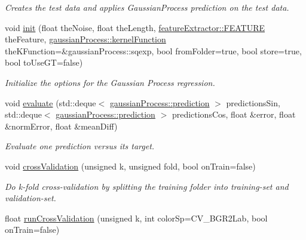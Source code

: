 \begin{DoxyCompactItemize}
\begin{DoxyCompactList}\small\item\em Creates the test data and applies {\ttfamily GaussianProcess} prediction on the test data. \item\end{DoxyCompactList}\item 
\hypertarget{classclassifyImages_a5e6aa99e69271c26a65886f98575a96f}{
void \hyperlink{classclassifyImages_a5e6aa99e69271c26a65886f98575a96f}{init} (float theNoise, float theLength, \hyperlink{classfeatureExtractor_a84a8847c4124b284d1d5ae20bc9be583}{featureExtractor::FEATURE} theFeature, \hyperlink{classgaussianProcess_a9255dbcbf2dc6ef9723b538659acd491}{gaussianProcess::kernelFunction} theKFunction=\&gaussianProcess::sqexp, bool fromFolder=true, bool store=true, bool toUseGT=false)}
\label{classclassifyImages_a5e6aa99e69271c26a65886f98575a96f}

\begin{DoxyCompactList}\small\item\em Initialize the options for the Gaussian Process regression. \item\end{DoxyCompactList}\item 
\hypertarget{classclassifyImages_af9c8000367d65a5b122d28b3a644524d}{
void \hyperlink{classclassifyImages_af9c8000367d65a5b122d28b3a644524d}{evaluate} (std::deque$<$ \hyperlink{structgaussianProcess_1_1prediction}{gaussianProcess::prediction} $>$ predictionsSin, std::deque$<$ \hyperlink{structgaussianProcess_1_1prediction}{gaussianProcess::prediction} $>$ predictionsCos, float \&error, float \&normError, float \&meanDiff)}
\label{classclassifyImages_af9c8000367d65a5b122d28b3a644524d}

\begin{DoxyCompactList}\small\item\em Evaluate one prediction versus its target. \item\end{DoxyCompactList}\item 
\hypertarget{classclassifyImages_a9ce049acd6facc12e25b5a93b594c8be}{
void \hyperlink{classclassifyImages_a9ce049acd6facc12e25b5a93b594c8be}{crossValidation} (unsigned k, unsigned fold, bool onTrain=false)}
\label{classclassifyImages_a9ce049acd6facc12e25b5a93b594c8be}

\begin{DoxyCompactList}\small\item\em Do k-\/fold cross-\/validation by splitting the training folder into training-\/set and validation-\/set. \item\end{DoxyCompactList}\item 
\hypertarget{classclassifyImages_a43f25d339fca753436874bcbbe1fcd9b}{
float \hyperlink{classclassifyImages_a43f25d339fca753436874bcbbe1fcd9b}{runCrossValidation} (unsigned k, int colorSp=CV\_\-BGR2Lab, bool onTrain=false)}
\label{classclassifyImages_a43f25d339fca753436874bcbbe1fcd9b}


\end{DoxyCompactItemize}
